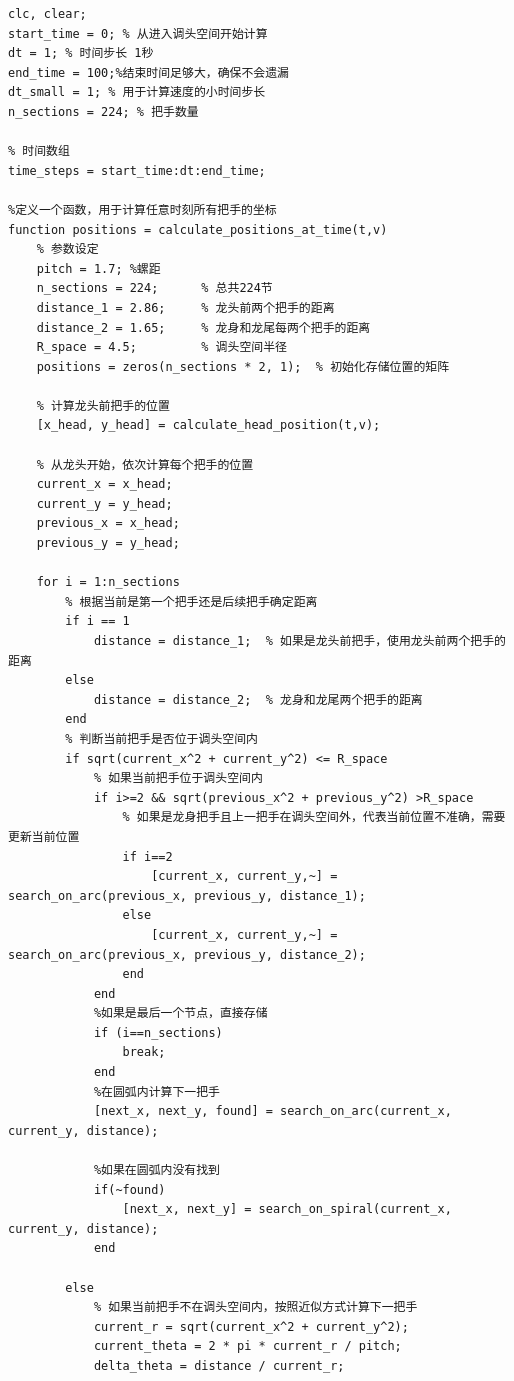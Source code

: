 \documentclass{cumcmthesis1}
\begin{document}
\begin{lstlisting}[caption={求解问题5的代码，将过程和结果打印到控制台上}, label={lst:tenth_code}]
clc, clear;
start_time = 0; % 从进入调头空间开始计算
dt = 1; % 时间步长 1秒
end_time = 100;%结束时间足够大，确保不会遗漏
dt_small = 1; % 用于计算速度的小时间步长
n_sections = 224; % 把手数量

% 时间数组
time_steps = start_time:dt:end_time;

%定义一个函数，用于计算任意时刻所有把手的坐标
function positions = calculate_positions_at_time(t,v)
    % 参数设定
    pitch = 1.7; %螺距
    n_sections = 224;      % 总共224节
    distance_1 = 2.86;     % 龙头前两个把手的距离
    distance_2 = 1.65;     % 龙身和龙尾每两个把手的距离
    R_space = 4.5;         % 调头空间半径
    positions = zeros(n_sections * 2, 1);  % 初始化存储位置的矩阵
    
    % 计算龙头前把手的位置
    [x_head, y_head] = calculate_head_position(t,v);

    % 从龙头开始，依次计算每个把手的位置
    current_x = x_head;
    current_y = y_head;
    previous_x = x_head;
    previous_y = y_head;

    for i = 1:n_sections
        % 根据当前是第一个把手还是后续把手确定距离
        if i == 1
            distance = distance_1;  % 如果是龙头前把手，使用龙头前两个把手的距离
        else
            distance = distance_2;  % 龙身和龙尾两个把手的距离
        end
        % 判断当前把手是否位于调头空间内
        if sqrt(current_x^2 + current_y^2) <= R_space
            % 如果当前把手位于调头空间内
            if i>=2 && sqrt(previous_x^2 + previous_y^2) >R_space
                % 如果是龙身把手且上一把手在调头空间外，代表当前位置不准确，需要更新当前位置
                if i==2
                    [current_x, current_y,~] = search_on_arc(previous_x, previous_y, distance_1);
                else
                    [current_x, current_y,~] = search_on_arc(previous_x, previous_y, distance_2);
                end
            end
            %如果是最后一个节点，直接存储
            if (i==n_sections)
                break;
            end
            %在圆弧内计算下一把手
            [next_x, next_y, found] = search_on_arc(current_x, current_y, distance);

            %如果在圆弧内没有找到
            if(~found)
                [next_x, next_y] = search_on_spiral(current_x, current_y, distance);
            end

        else
            % 如果当前把手不在调头空间内，按照近似方式计算下一把手
            current_r = sqrt(current_x^2 + current_y^2);
            current_theta = 2 * pi * current_r / pitch;
            delta_theta = distance / current_r;


\end{lstlisting}
\end{document}
